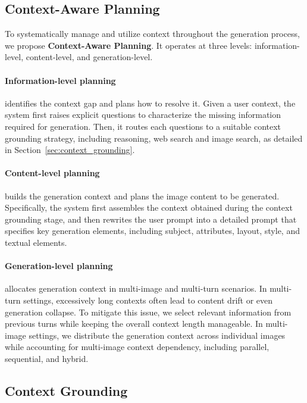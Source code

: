 \subsection{Context-Aware Planning}

To systematically manage and utilize context throughout the generation process, we propose \textbf{Context-Aware Planning}. It operates at three levels: information-level, content-level, and generation-level.

\paragraph{Information-level planning} identifies the context gap and plans how to resolve it. Given a user context, the system first raises explicit questions to characterize the missing information required for generation. Then, it routes each questions to a suitable context grounding strategy, including reasoning, web search and image search, as detailed in Section~\ref{sec:context_grounding}.

\paragraph{Content-level planning} builds the generation context and plans the image content to be generated. Specifically, the system first assembles the context obtained during the context grounding stage, and then rewrites the user prompt into a detailed prompt that specifies key generation elements, including subject, attributes, layout, style, and textual elements.

\paragraph{Generation-level planning} allocates generation context in multi-image and multi-turn scenarios. In multi-turn settings, excessively long contexts often lead to content drift or even generation collapse. To mitigate this issue, we select relevant information from previous turns while keeping the overall context length manageable. In multi-image settings, we distribute the generation context across individual images while accounting for multi-image context dependency, including parallel, sequential, and hybrid.

\subsection{Context Grounding}~\label{sec:context_grounding}

